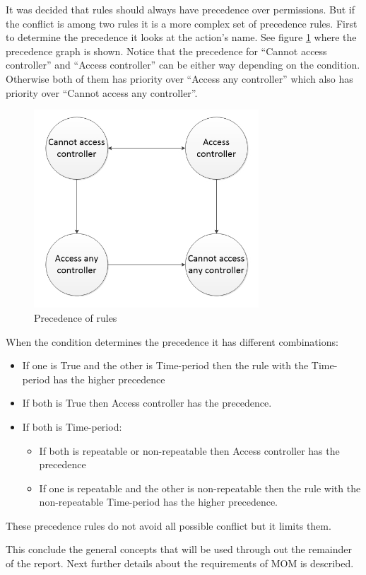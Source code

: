 It was decided that rules should always have precedence over permissions. But if the conflict is among two rules it is a more complex set of precedence rules. First to determine the precedence it looks at the action's name. See figure \ref{fig:precendence} where the precedence graph is shown. Notice that the precedence for ``Cannot access controller'' and ``Access controller'' can be either way depending on the condition. Otherwise both of them has priority over ``Access any controller'' which also has priority over ``Cannot access any controller''. 
  
\begin{figure}
	\centering
		\includegraphics[width=0.75\textwidth]{images/precendence.jpg}
	\caption{Precedence of rules}
	\label{fig:precendence}
\end{figure}

When the condition determines the precedence it has different combinations:

\begin{itemize}
	\item If one is True and the other is Time-period then the rule with the Time-period has the higher precedence
	\item If both is True then Access controller has the precedence.
	\item If both is Time-period:
		\begin{itemize}
			\item If both is repeatable or non-repeatable%
			then Access controller has the precedence
			\item If one is repeatable and the other is non-repeatable then the rule with the non-repeatable Time-period has the higher precedence.
		\end{itemize}
\end{itemize}

These precedence rules do not avoid all possible conflict but it limits them.  


This conclude the general concepts that will be used through out the remainder of the report. Next further details about the requirements of MOM is described.